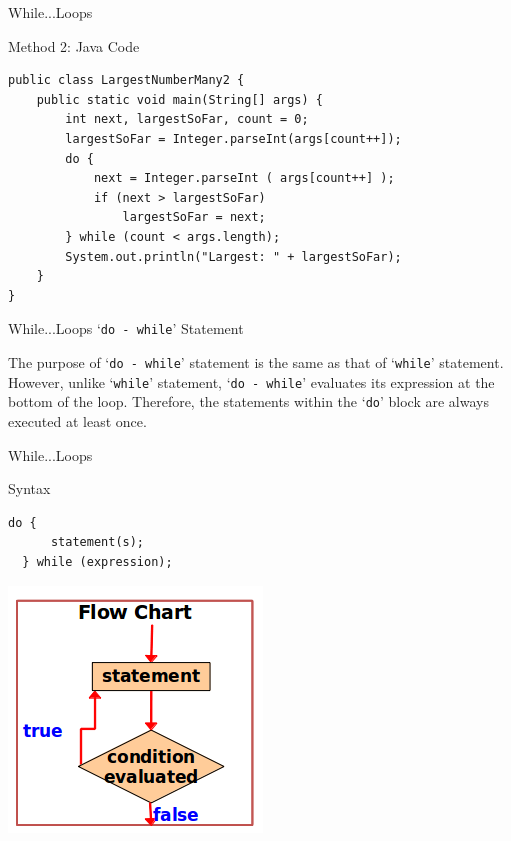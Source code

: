 \documentclass[14pt]{beamer}
\begin{document}
\begin{frame}[fragile]{While...Loops}
 \begin{block}{Method 2: Java Code}
  \begin{lstlisting}[numbers=none]
public class LargestNumberMany2 {
    public static void main(String[] args) {
        int next, largestSoFar, count = 0;
        largestSoFar = Integer.parseInt(args[count++]);
        do {
            next = Integer.parseInt ( args[count++] );
            if (next > largestSoFar)
                largestSoFar = next;
        } while (count < args.length);
        System.out.println("Largest: " + largestSoFar);
    }
}
 \end{lstlisting}
 \end{block}
\end{frame}

\begin{frame}[fragile]{While...Loops}
 `\lstinline!do - while!' Statement
  
  \vspace{1pc}
  The purpose of `\lstinline!do - while!' statement is the same as that of `\lstinline!while!' statement. However, unlike `\lstinline!while!' statement, `\lstinline!do - while!' evaluates its expression at the bottom of the loop. Therefore, the statements within the `\lstinline!do!' block are always executed at least once.
\end{frame}

\begin{frame}[fragile]{While...Loops}
  \begin{minipage}{5cm}
  \begin{block}{Syntax}
   \begin{lstlisting}[numbers=none]
  do { 
      statement(s);
  } while (expression);
   \end{lstlisting}

  \end{block}
 \end{minipage}
 \quad
 \begin{minipage}{4cm}
  \includegraphics[scale=.4]{do-while-flow-chart.png}
 \end{minipage}
\end{frame}
\end{document}
